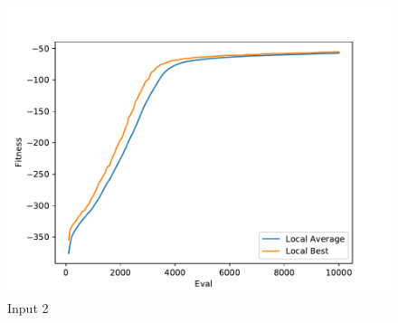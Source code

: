 \documentclass{standalone}
\begin{document}
\begin{figure}[!htb]
	\caption{Input 2}
	\label{fig:graph_2052}
	\includegraphics[width=\textwidth]{../graphs/graphs/2052.pdf}
\end{figure}
\end{document}

